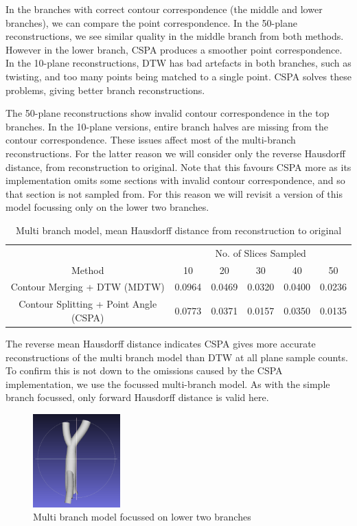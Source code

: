 \documentclass[11p, titlepage]{article}
\begin{document}
In the branches with correct contour correspondence (the middle and lower branches), we can compare the point correspondence. In the 50-plane reconstructions, we see similar quality in the middle branch from both methods. However in the lower branch, CSPA produces a smoother point correspondence. In the 10-plane reconstructions, DTW has bad artefacts in both branches, such as twisting, and too many points being matched to a single point. CSPA solves these problems, giving better branch reconstructions.

The 50-plane reconstructions show invalid contour correspondence in the top branches. In the 10-plane versions, entire branch halves are missing from the contour correspondence. These issues affect most of the multi-branch reconstructions. For the latter reason we will consider only the reverse Hausdorff distance, from reconstruction to original. Note that this favours CSPA more as its implementation omits some sections with invalid contour correspondence, and so that section is not sampled from. For this reason we will revisit a version of this model focussing only on the lower two branches.

\begin{table}[h!]
\begin{tabular}{ | c | c | c | c | c | c | }
\hline
& \multicolumn{5}{c|}{No. of Slices Sampled} \\
\cline{2-6}
Method & 10 & 20 & 30 & 40 & 50 \\
\hline
Contour Merging + DTW (MDTW) & 0.0964 & 0.0469 & 0.0320 & 0.0400 & 0.0236 \\
Contour Splitting + Point Angle (CSPA) & 0.0773 & 0.0371 & 0.0157 & 0.0350 & 0.0135 \\
\hline
\end{tabular}
\caption{Multi branch model, mean Hausdorff distance from reconstruction to original}
\label{table:multi_branch_reverse}
\end{table}

The reverse mean Hausdorff distance indicates CSPA gives more accurate reconstructions of the multi branch model than DTW at all plane sample counts. To confirm this is not down to the omissions caused by the CSPA implementation, we use the focussed multi-branch model. As with the simple branch focussed, only forward Hausdorff distance is valid here.

\begin{figure}[h!]
\centering
\includegraphics[width=0.3\textwidth]{originals/multi-branch-2-7}
\caption{Multi branch model focussed on lower two branches\label{fig:multi_branch_focussed}}
\end{figure}
\end{document}
